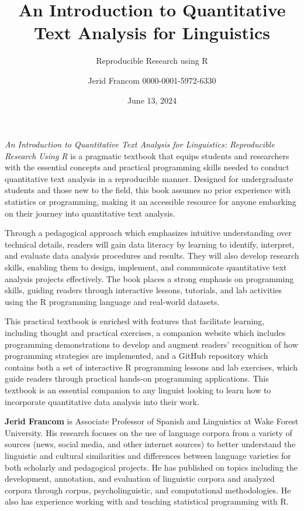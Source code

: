\documentclass[
  letterpaper,
  krantz1]{latex/krantz-mod}
\title{An Introduction to Quantitative Text Analysis for Linguistics}
\subtitle{Reproducible Research using R}
\author{Jerid Francom 0000-0001-5972-6330}%
\date{June 13, 2024}
\theoremstyle{definition}
\theoremstyle{definition}
\theoremstyle{remark}
\begin{document}
\setcounter{page}{1} %

\textit{An Introduction to Quantitative Text Analysis for Linguistics: Reproducible Research Using R} is a pragmatic textbook that equips students and researchers with the essential concepts and practical programming skills needed to conduct quantitative text analysis in a reproducible manner. Designed for undergraduate students and those new to the field, this book assumes no prior experience with statistics or programming, making it an accessible resource for anyone embarking on their journey into quantitative text analysis.


Through a pedagogical approach which emphasizes intuitive understanding over technical details, readers will gain data literacy by learning to identify, interpret, and evaluate data analysis procedures and results. They will also develop research skills, enabling them to design, implement, and communicate quantitative text analysis projects effectively. The book places a strong emphasis on programming skills, guiding readers through interactive lessons, tutorials, and lab activities using the R programming language and real-world datasets.


This practical textbook is enriched with features that facilitate learning, including thought and practical exercises, a companion website which includes programming demonstrations to develop and augment readers' recognition of how programming strategies are implemented, and a GitHub repository which contains both a set of interactive R programming lessons and lab exercises, which guide readers through practical hands-on programming applications. This textbook is an essential companion to any linguist looking to learn how to incorporate quantitative data analysis into their work.


\textbf{Jerid Francom} is Associate Professor of Spanish and Linguistics at Wake Forest University. His research focuses on the use of language corpora from a variety of sources (news, social media, and other internet sources) to better understand the linguistic and cultural similarities and differences between language varieties for both scholarly and pedagogical projects. He has published on topics including the development, annotation, and evaluation of linguistic corpora and analyzed corpora through corpus, psycholinguistic, and computational methodologies. He also has experience working with and teaching statistical programming with R.
\end{document}
